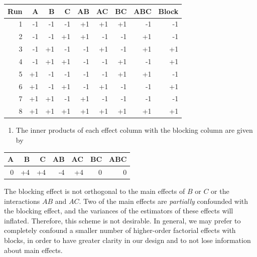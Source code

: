\documentclass[
]{book}
\providecommand{\tightlist}{%
  \setlength{\itemsep}{0pt}\setlength{\parskip}{0pt}}
\theoremstyle{definition}
\theoremstyle{definition}
\theoremstyle{definition}
\theoremstyle{definition}
\theoremstyle{remark}
\begin{document}
\begin{longtable}[]{@{}rrrrrrrrr@{}}
\toprule
Run & A & B & C & AB & AC & BC & ABC & Block \\
\midrule
\endhead
1 & -1 & -1 & -1 & +1 & +1 & +1 & -1 & -1 \\
2 & -1 & -1 & +1 & +1 & -1 & -1 & +1 & -1 \\
3 & -1 & +1 & -1 & -1 & +1 & -1 & +1 & +1 \\
4 & -1 & +1 & +1 & -1 & -1 & +1 & -1 & +1 \\
5 & +1 & -1 & -1 & -1 & -1 & +1 & +1 & -1 \\
6 & +1 & -1 & +1 & -1 & +1 & -1 & -1 & +1 \\
7 & +1 & +1 & -1 & +1 & -1 & -1 & -1 & -1 \\
8 & +1 & +1 & +1 & +1 & +1 & +1 & +1 & +1 \\
\bottomrule
\end{longtable}

\begin{enumerate}
\def\labelenumi{\alph{enumi}.}
\setcounter{enumi}{1}
\tightlist
\item
  The inner products of each effect column with the blocking column are given by
\end{enumerate}

\begin{longtable}[]{@{}rrrrrrr@{}}
\toprule
A & B & C & AB & AC & BC & ABC \\
\midrule
\endhead
0 & +4 & +4 & -4 & +4 & 0 & 0 \\
\bottomrule
\end{longtable}

The blocking effect is not orthogonal to the main effects of \(B\) or \(C\) or the interactions \(AB\) and \(AC\). Two of the main effects are \emph{partially} confounded with the blocking effect, and the variances of the estimators of these effects will inflated. Therefore, this scheme is not desirable. In general, we may prefer to completely confound a smaller number of higher-order factorial effects with blocks, in order to have greater clarity in our design and to not lose information about main effects.
\end{document}
